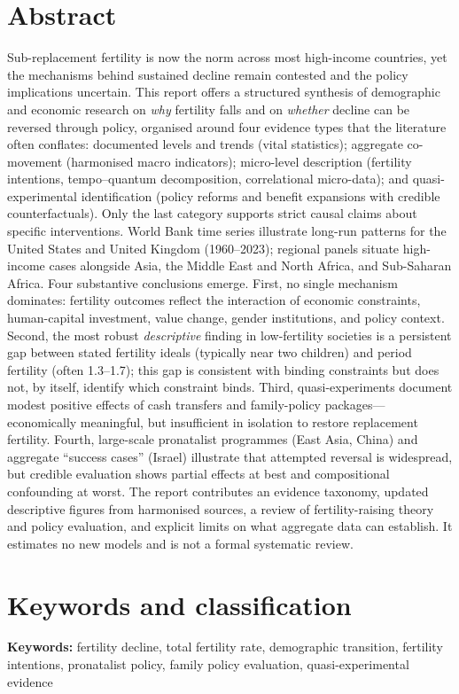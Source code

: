 \documentclass[11pt,a4paper,openany]{book}
\begin{document}
\chapter*{Abstract}
\noindent
Sub-replacement fertility is now the norm across most high-income countries, yet the mechanisms behind sustained decline remain contested and the policy implications uncertain. This report offers a structured synthesis of demographic and economic research on \emph{why} fertility falls and on \emph{whether} decline can be reversed through policy, organised around four evidence types that the literature often conflates: documented levels and trends (vital statistics); aggregate co-movement (harmonised macro indicators); micro-level description (fertility intentions, tempo--quantum decomposition, correlational micro-data); and quasi-experimental identification (policy reforms and benefit expansions with credible counterfactuals). Only the last category supports strict causal claims about specific interventions. World Bank time series illustrate long-run patterns for the United States and United Kingdom (1960--2023); regional panels situate high-income cases alongside Asia, the Middle East and North Africa, and Sub-Saharan Africa. Four substantive conclusions emerge. First, no single mechanism dominates: fertility outcomes reflect the interaction of economic constraints, human-capital investment, value change, gender institutions, and policy context. Second, the most robust \emph{descriptive} finding in low-fertility societies is a persistent gap between stated fertility ideals (typically near two children) and period fertility (often 1.3--1.7); this gap is consistent with binding constraints but does not, by itself, identify which constraint binds. Third, quasi-experiments document modest positive effects of cash transfers and family-policy packages---economically meaningful, but insufficient in isolation to restore replacement fertility. Fourth, large-scale pronatalist programmes (East Asia, China) and aggregate ``success cases'' (Israel) illustrate that attempted reversal is widespread, but credible evaluation shows partial effects at best and compositional confounding at worst. The report contributes an evidence taxonomy, updated descriptive figures from harmonised sources, a review of fertility-raising theory and policy evaluation, and explicit limits on what aggregate data can establish. It estimates no new models and is not a formal systematic review.

\chapter*{Keywords and classification}
\noindent\textbf{Keywords:} fertility decline, total fertility rate, demographic transition, fertility intentions, pronatalist policy, family policy evaluation, quasi-experimental evidence
\end{document}
